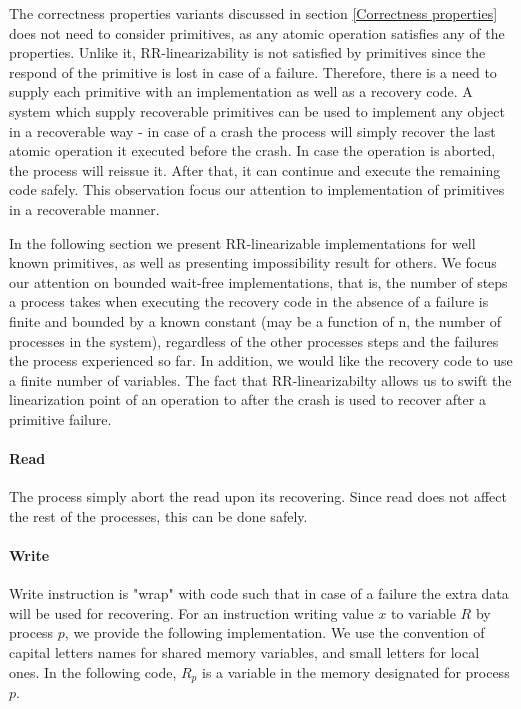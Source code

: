 \documentclass{article}
\begin{document}
The correctness properties variants discussed in section \ref{Correctness properties} does not need to consider primitives, as any atomic operation satisfies any of the properties. Unlike it, RR-linearizability is not satisfied by primitives since the respond of the primitive is lost in case of a failure. Therefore, there is a need to supply each primitive with an implementation as well as a recovery code. A system which supply recoverable primitives can be used to implement any object in a recoverable way - in case of a crash the process will simply recover the last atomic operation it executed before the crash. In case the operation is aborted, the process will reissue it. After that, it can continue and execute the remaining code safely. This observation focus our attention to implementation of primitives in a recoverable manner.

In the following section we present RR-linearizable implementations for well known primitives, as well as presenting impossibility result for others. We focus our attention on bounded wait-free implementations, that is, the number of steps a process takes when executing the recovery code in the absence of a failure is finite and bounded by a known constant (may be a function of n, the number of processes in the system), regardless of the other processes steps and the failures the process experienced so far. In addition, we would like the recovery code to use a finite number of variables.
The fact that RR-linearizabilty allows us to swift the linearization point of an operation to after the crash is used to recover after a primitive failure.

\paragraph*{Read}

The process simply abort the read upon its recovering. Since read does not affect the rest of the processes, this can be done safely.

\paragraph*{Write}
Write instruction is "wrap" with code such that in case of a failure the extra data will be used for recovering. For an instruction writing value $x$ to variable $R$ by process $p$, we provide the following implementation. We use the convention of capital letters names for shared memory variables, and small letters for local ones. In the following code, $R_p$ is a variable in the memory designated for process $p$.
\end{document}
